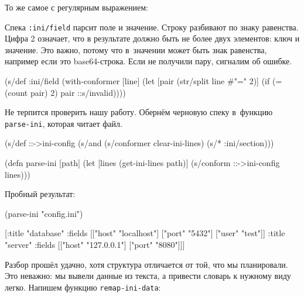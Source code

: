 \noindent
То же самое с регулярным выражением:

\begin{english}
\end{english}


Спека \verb|:ini/field| парсит поле и значение. Строку разбивают по знаку
равенства. Цифра 2 означает, что в результате должно быть не более двух
элементов: ключ и значение. Это важно, потому что в~значении может быть знак
равенства, например если это base64-строка. Если не получили пару, сигналим об
ошибке.

\begin{english}
  \begin{clojure}
(s/def :ini/field
  (with-conformer [line]
    (let [pair (str/split line #"=" 2)]
      (if (= (count pair) 2)
        pair
        ::s/invalid))))
  \end{clojure}
\end{english}

Не терпится проверить нашу работу. Обернём черновую спеку в~функцию
\verb|parse-ini|, которая читает файл.

\begin{english}
  \begin{clojure}
(s/def ::->ini-config
  (s/and
   (s/conformer clear-ini-lines)
   (s/* :ini/section)))

(defn parse-ini [path]
  (let [lines (get-ini-lines path)]
    (s/conform ::->ini-config lines)))
  \end{clojure}
\end{english}

\noindent
Пробный результат:

\begin{english}
  \begin{clojure}
(parse-ini "config.ini")

[{:title "database"
  :fields [["host" "localhost"]
           ["port" "5432"]
           ["user" "test"]]}
 {:title "server"
  :fields [["host" "127.0.0.1"]
           ["port" "8080"]]}]
  \end{clojure}
\end{english}

Разбор прошёл удачно, хотя структура отличается от той, что мы планировали. Это
неважно: мы вывели данные из текста, а привести словарь к нужному виду
легко. Напишем функцию \verb|remap-ini-data|:

